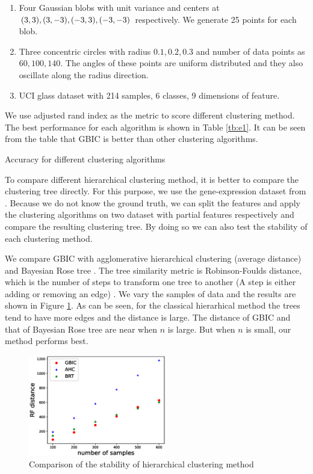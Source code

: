 \begin{enumerate}
\item Four Gaussian blobs with unit variance and centers at $(3,3), (3,-3), (-3,3),  \linebreak[4](-3,-3)$ respectively.  We generate 25 points for each blob.
\item Three concentric circles with radius $0.1,0.2,0.3$ and number of data points as $60, 100, 140$. The angles of these points are uniform distributed and they also oscillate along the radius direction.
\item UCI glass dataset with 214 samples, 6 classes, 9 dimensions of feature.
\end{enumerate}
We use adjusted rand index as the metric to score different clustering method.
The best performance for each algorithm is shown in Table \ref{tb:e1}.
It can be seen from the table that GBIC is better than other clustering algorithms.
\begin{table}[!ht]
\centering
{}
\caption{ Accuracy for different clustering algorithms }\label{tb:e1}
\end{table}

To compare different hierarchical clustering method, it is better to compare the clustering tree directly.
For this purpose,
we use the gene-expression dataset from \cite{khan2001classification}.
Because we do not know the ground truth, we can split the features and apply the clustering algorithms on two dataset with partial features respectively and compare the resulting clustering tree. By doing so we can also test the stability of each clustering method.

We compare GBIC with agglomerative hierarchical clustering (average distance) and Bayesian Rose tree \citep{blundell2011discovering}. The tree similarity metric is Robinson-Foulds distance, which is the number of steps to transform one tree to another (A step is either adding or removing an edge) \citep{day1985optimal}. We vary the samples of data and the results are shown in Figure \ref{fig:shc}. As can be seen, for the classical hierarhical method the trees tend to have more edges and the distance is large. The distance of GBIC and that of Bayesian Rose tree are near when $n$ is large. But when $n$ is small, our method performs best.

\begin{figure}
\centering
\includegraphics[width=6cm]{pic/plot_results.eps}
\caption{Comparison of the stability of hierarchical clustering method}\label{fig:shc}
\end{figure}

